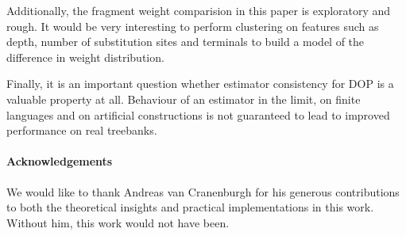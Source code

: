 Additionally, the fragment weight comparision in this paper is exploratory and rough. It would be very interesting to perform clustering on features such as depth, number of substitution sites and terminals to build a model of the difference in weight distribution.

Finally, it is an important question whether estimator consistency for DOP is a valuable property at all. Behaviour of an estimator in the limit, on finite languages and on artificial constructions is not guaranteed to lead to improved performance on real treebanks. 

\paragraph{Acknowledgements}
We would like to thank Andreas van Cranenburgh for his generous contributions to both the theoretical insights and practical implementations in this work. Without him, this work would not have been.
